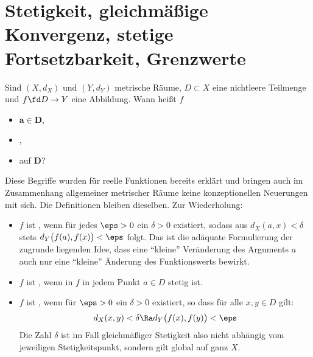 \section{Stetigkeit, gleichmäßige Konvergenz, stetige 
  Fortsetzbarkeit, Grenzwerte}

\begin{frage}
  Sind $(X,d_X)$ und $(Y,d_Y)$ metrische Räume, $D\subset X$ eine 
  nichtleere Teilmenge und $f\fd D\to Y$ eine Abbildung. Wann heißt $f$
  {\setlength{\labelsep}{4mm}
    \begin{itemize}
    \item[\desc{a}]  $\mathbf{a\in D}$,\\[-3mm]
    \item[\desc{b}] ,\\[-3mm]
    \item[\desc{c}]  auf $\mathbf{D}$?
    \end{itemize}}
\end{frage}

\begin{antwort}
  Diese Begriffe wurden für reelle Funktionen bereits erklärt 
  und bringen auch im Zusammenhang allgemeiner metrischer Räume 
  keine konzeptionellen Neuerungen mit sich. Die Definitionen 
  bleiben dieselben. Zur Wiederholung: 
  {\setlength{\labelsep}{4mm}
    \begin{itemize}
    \item[\desc{a}] $f$ ist , wenn für 
      jedes $\eps>0$ ein $\delta>0$ existiert, sodass aus 
      $d_X(a,x) < \delta$ stets $d_Y\big( f(a), f(x) \big)<\eps$ 
      folgt. Das ist die adäquate Formulierung der zugrunde liegenden 
      Idee, dass eine "`kleine"' Veränderung des Arguments $a$ auch nur  
      eine "`kleine"' Änderung des Funktionswerts bewirkt. \\[-3mm] 
    \item[\desc{b}] $f$ ist , wenn in $f$ in jedem 
      Punkt $a\in D$ stetig ist.\\[-3mm]
    \item[\desc{c}] $f$ ist , wenn für 
       $\eps>0$ ein $\delta >0$ existiert, so dass 
      für alle $x,y\in D$ gilt:
      \begin{equation}
        d_X(x,y) < \delta \Ra d_Y \big( f(x),f(y) \big) < \eps  
        \notag
      \end{equation}
      Die Zahl $\delta$ ist im Fall gleichmäßiger Stetigkeit also nicht abhängig 
      vom jeweiligen Stetigkeitspunkt, sondern gilt global auf ganz $X$. \AntEnd
    \end{itemize}}
\end{antwort}

